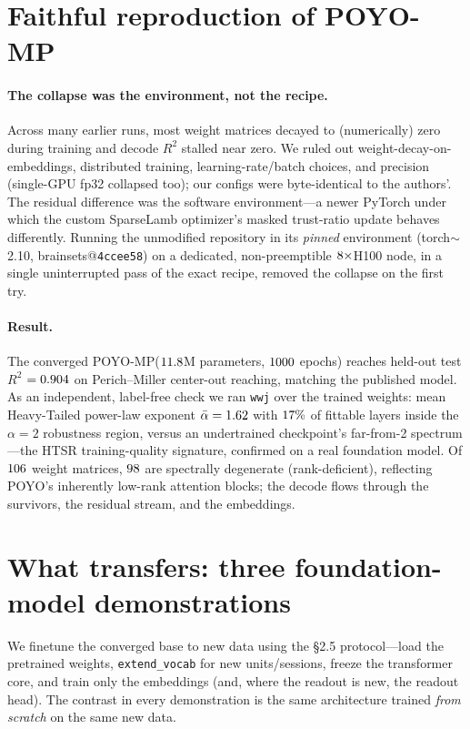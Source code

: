 \documentclass{article} %
\newcommand{\poyo}{POYO\xspace}
\newcommand{\poymp}{POYO-MP\xspace}
\newcommand{\wwj}{\texttt{wwj}\xspace}
\newcommand{\rtwo}{$R^2$\xspace}
\begin{document}
\section{Faithful reproduction of \poymp}
\label{sec:repro}
\paragraph{The collapse was the environment, not the recipe.} Across many earlier runs, most
weight matrices decayed to (numerically) zero during training and decode \rtwo{} stalled near
zero. We ruled out weight-decay-on-embeddings, distributed training, learning-rate/batch
choices, and precision (single-GPU fp32 collapsed too); our configs were byte-identical to
the authors'. The residual difference was the software environment---a newer PyTorch under
which the custom SparseLamb optimizer's masked trust-ratio update behaves differently. Running
the unmodified repository in its \emph{pinned} environment (torch${\sim}$2.10,
brainsets@\texttt{4ccee58}) on a dedicated, non-preemptible $8\times$H100 node, in a
single uninterrupted pass of the exact recipe, removed the collapse on the first try.

\paragraph{Result.} The converged \poymp ($11.8$M parameters, $1000$ epochs)
reaches held-out test \rtwo{} $=0.904$ on Perich--Miller center-out reaching, matching
the published model. As an independent, label-free check we ran \wwj over the trained weights:
mean Heavy-Tailed power-law exponent $\bar\alpha=1.62$ with $17\%$ of fittable
layers inside the $\alpha\!=\!2$ robustness region, versus an undertrained checkpoint's far-from-2
spectrum---the HTSR training-quality signature, confirmed on a real foundation model. Of
$106$ weight matrices, $98$ are spectrally degenerate (rank-deficient), reflecting
\poyo's inherently low-rank attention blocks; the decode flows through the survivors, the
residual stream, and the embeddings.

\section{What transfers: three foundation-model demonstrations}
\label{sec:transfer}
We finetune the converged base to new data using the \S2.5 protocol---load the pretrained
weights, \texttt{extend\_vocab} for new units/sessions, freeze the transformer core, and train
only the embeddings (and, where the readout is new, the readout head). The contrast in every
demonstration is the same architecture trained \emph{from scratch} on the same new data.
\end{document}
